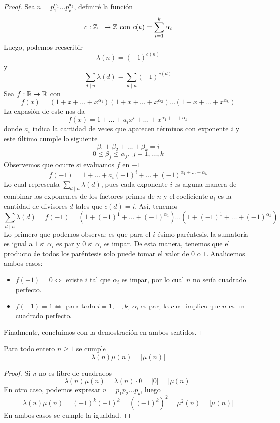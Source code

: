 \documentclass[main.tex]{subfiles}
\begin{document}
\begin{proof}
Sea $n = p_1^{\alpha_1}\dots p_k^{\alpha_k}$, definir\'e la funci\'on 
$$c: \mathbb Z^+ \to \mathbb Z \text{ con } c(n) = \sum_{i = 1}^k \alpha_i$$
Luego, podemos reescribir
$$\lambda(n) = (-1)^{c(n)}$$
y
$$\sum_{d \mid n} \lambda(d) = \sum_{d \mid n} (-1)^{c(d)}$$
Sea $f:\mathbb R\to\mathbb R$ con
$$f(x) = (1 + x + \dots + x^{\alpha_1})(1 + x + \dots + x^{\alpha_2})\dots(1 + x + \dots + x^{\alpha_k})$$
La expasi\'on de este nos da
$$f(x) = 1 + \dots + a_i x^i + \dots + x^{\alpha_1 + \dots + \alpha_k}$$
donde $a_i$ indica la cantidad de veces que aparecen t\'erminos con exponente $i$ y este \'ultimo cumple lo siguiente
$$\beta_1 + \beta_2 + \dots + \beta_k = i$$
$$0 \leq \beta_j \leq \alpha_j,\; j = 1, \dots, k$$
Observemos que ocurre si evaluamos $f$ en $-1$
$$f(-1) = 1 + \dots + a_i (-1)^{i} + \dots + (-1)^{\alpha_1 + \dots + \alpha_k}$$
Lo cual representa $\sum_{d \mid n} \lambda(d)$, pues cada exponente $i$ es alguna manera de combinar los exponentes de los factores primos de $n$ y el coeficiente $a_i$ es la cantidad de divisores $d$ tales que $c(d) = i$. As\'i, tenemos
$$\sum_{d \mid n} \lambda(d) = f(-1) = (1 + (-1)^1 + \dots + (-1)^{\alpha_1})\dots(1 + (-1)^1 + \dots + (-1)^{\alpha_k})$$
Lo primero que podemos observar es que para el $i$-\'esimo par\'entesis, la sumatoria es igual a $1$ si $\alpha_i$ es par y $0$ si $\alpha_i$ es impar. De esta manera, tenemos que el producto de todos los par\'entesis solo puede tomar el valor de $0$ o $1$. Analicemos ambos casos:
\begin{itemize}
    \item $f(-1) = 0 \iff$ existe $i$ tal que $\alpha_i$ es impar, por lo cual $n$ no ser\'ia cuadrado perfecto.
    \item $f(-1) = 1 \iff$ para todo $i = 1, \dots, k$, $\alpha_i$ es par, lo cual implica que $n$ es un cuadrado perfecto.
\end{itemize}
Finalmente, concluimos con la demostraci\'on en ambos sentidos.
\end{proof}
\begin{theorem}
Para todo entero $n \geq 1$ se cumple
$$\lambda(n)\mu(n) = |\mu(n)|$$
\end{theorem}
\begin{proof}
Si $n$ no es libre de cuadrados
$$\lambda(n)\mu(n) = \lambda(n)\cdot0 = |0| = |\mu(n)|$$
En otro caso, podemos expresar $n = p_1 p_2 \dots p_k$, luego
$$\lambda(n)\mu(n) = (-1)^k(-1)^k = ((-1)^k)^2 = \mu^2(n) = |\mu(n)|$$
En ambos casos se cumple la igualdad.
\end{proof}
\end{document}
